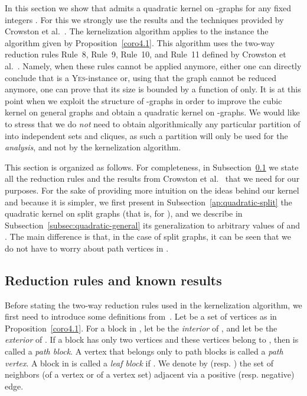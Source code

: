 \documentclass[
final
]{dmtcs-episciences}
\begin{document}
In this section we show that {} admits a quadratic kernel on -graphs for any fixed integers . For this we strongly use the results and the techniques provided by Crowston et al.~\cite{crowston2013maximum}. The kernelization algorithm applies to the instance  the algorithm given by Proposition~\ref{coro4.1}. This algorithm uses the two-way reduction rules Rule~8, Rule~9, Rule~10, and Rule~11 defined by Crowston et al.~\cite{crowston2013maximum}. Namely, when these rules cannot be applied anymore, either one can directly conclude that  is a  \textsc{Yes}-instance or, using that the graph cannot be reduced anymore, one can prove that its size is bounded by a function of  only. It is at this point when we exploit the structure of -graphs in order to improve the cubic kernel on general graphs and obtain a quadratic kernel on -graphs. We would like to stress that we do {\sl not} need to obtain algorithmically any particular partition of  into  independent sets and  cliques, as such a partition will only be used for the {\sl analysis}, and not by the kernelization algorithm.



This section is organized as follows. For completeness, in Subsection~\ref{sec:rules} we state all the reduction rules and the results from Crowston et al.~\cite{crowston2013maximum} that we need for our purposes. For the sake of providing more intuition on the ideas behind our kernel and because it is simpler, we first present in Subsection~\ref{ap:quadratic-split} the quadratic kernel on split graphs (that is, for ), and we describe in Subsection~\ref{subsec:quadratic-general} its generalization to arbitrary values of  and . The main difference is that, in the case of split graphs, it can be seen that we do not have to worry about path vertices in .

\subsection{Reduction rules and known results}
\label{sec:rules}


Before stating the two-way reduction rules used in the kernelization algorithm, we first need to introduce some definitions from~\cite{crowston2013maximum}. Let  be a set of vertices as in Proposition~\ref{coro4.1}. For a block  in , let   be the {\it{interior}} of , and let  be the {\it{exterior}} of .
If a block  has only two vertices and these vertices belong to , then  is called a {\it{path block}}. A vertex that belongs only to path blocks is called a {\it{path vertex}}. A block  in  is called a {\it{leaf block}} if . We denote by  (resp. ) the set of neighbors (of a vertex or of a vertex set) adjacent via a positive (resp. negative) edge.
\end{document}
